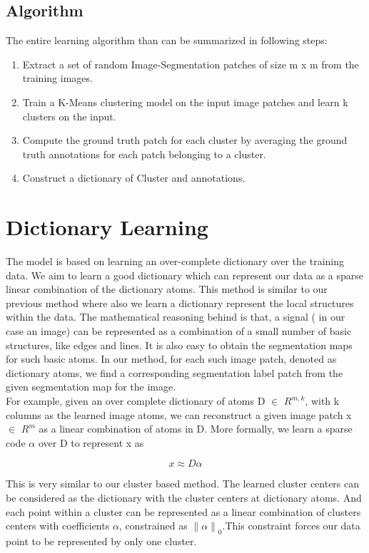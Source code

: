\subsection{Algorithm}
The entire learning algorithm than can be summarized in following steps:
\begin{enumerate}
	\item Extract a set of random Image-Segmentation patches of size m x m from the training images.
	\item Train a K-Means clustering model on the input image patches and learn k clusters on the input.
	\item Compute the ground truth patch for each cluster by averaging the ground truth annotations for each patch belonging to a cluster. 
	\item Construct a dictionary of Cluster and annotations.
\end{enumerate}


\section{Dictionary Learning}
The model is based on learning an over-complete dictionary over the training data. We aim to learn a good dictionary which can represent our data as a sparse linear combination of the dictionary atoms.
This method is similar to our previous method where also we learn a dictionary represent the local structures within the data. The mathematical reasoning behind is that, a signal ( in our case an image) can be represented as a combination of a small number of basic structures, like edges and lines.
It is also easy to obtain the segmentation maps for such basic atoms. In our method, for each such image patch, denoted as dictionary atoms, we find a corresponding segmentation label patch from the given segmentation map for the image.\\

For example, given an over complete dictionary of atoms D $\in$ $R^{m,k}$, with k columns as the learned image atoms, we can reconstruct a given image patch x $\in$ $R^m$ as a linear combination of atoms in D. More formally, we learn a sparse code $\alpha$ over D to represent x as

$$ x \approx D \alpha $$  

This is very similar to our cluster based method. The learned cluster centers can be considered as the dictionary with the cluster centers at dictionary atoms. And each point within a cluster can be represented as a linear combination of clusters centers with coefficients $\alpha$, constrained as ${\lVert \alpha \rVert}_0$.This constraint forces our data point to be represented by only one cluster.

